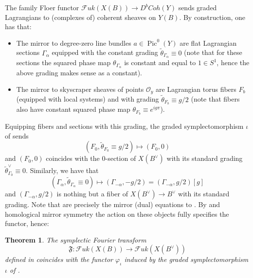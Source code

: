 \documentclass[10pt]{amsart}
\newtheorem{thm}{Theorem}[section]
\theoremstyle{definition}
\theoremstyle{remark}
\DeclareMathOperator{\Pic}{Pic}
\newcommand{\mcal}{\mathcal}
\begin{document}
The family Floer functor $\mcal Fuk(X(B)) \to D^bCoh(Y)$ sends graded Lagrangians to (complexes of) coherent sheaves on $Y(B)$.
By construction, one has that:
\begin{itemize}
    \item The mirror to degree-zero line bundles $a \in \Pic^0(Y)$ are flat Lagrangian sections $\Gamma_\alpha$ equipped with the constant grading $\tilde\theta_{\Gamma_\alpha} \equiv 0$ (note that for these sections the squared phase map $\theta_{\Gamma_\alpha}$ is constant and equal to $1 \in S^1$, hence the above grading makes sense as a constant).
    \item The mirror to skyscraper sheaves of points $\mcal O_y$ are Lagrangian torus fibers $F_b$ (equipped with local systems) and with grading $\tilde\theta_{F_b} \equiv g/2$ (note that fibers also have constant squared phase map $\theta_{F_b} \equiv e^{ig\pi}$).
\end{itemize}
Equipping fibers and sections with this grading, the graded symplectomorphism $\iota$ of  sends
\begin{equation}\label{eq:sympl_fourier_on_fibers}
    (F_0, \tilde\theta_{F_0} \equiv g/2) \mapsto (F_0, 0)
\end{equation}
and $(F_0, 0)$ coincides with the $0$-section of $X(B^\vee)$ with its standard grading $\tilde\theta^\vee_{\Gamma_0} \equiv 0$.
Similarly, we have that
\begin{equation}\label{eq:sympl_fourier_on_sections}
(\Gamma_\alpha, \tilde\theta_{\Gamma_\alpha} \equiv 0) \mapsto (\Gamma_{-\alpha}, -g/2) = (\Gamma_{-\alpha}, g/2)[g]
\end{equation}
and $(\Gamma_{-\alpha}, g/2)$ is nothing but a fiber of $X(B^\vee) \to B^\vee$ with its standard grading.
Note that  are precisely the mirror (dual) equations to . 
By  and homological mirror symmetry \cite{abouzaid2021homological} the action on these objects fully specifies the functor, hence:

\begin{thm}\label{prop:symplecticfourier}
    The symplectic Fourier transform 
    $$
    \mathfrak F: \mcal Fuk(X(B)) \to \mcal Fuk(X(B^\vee))
    $$
    defined in  coincides with the functor $\varphi_\iota$ induced by the graded symplectomorphism $\iota$ of .
\end{thm}
\end{document}
